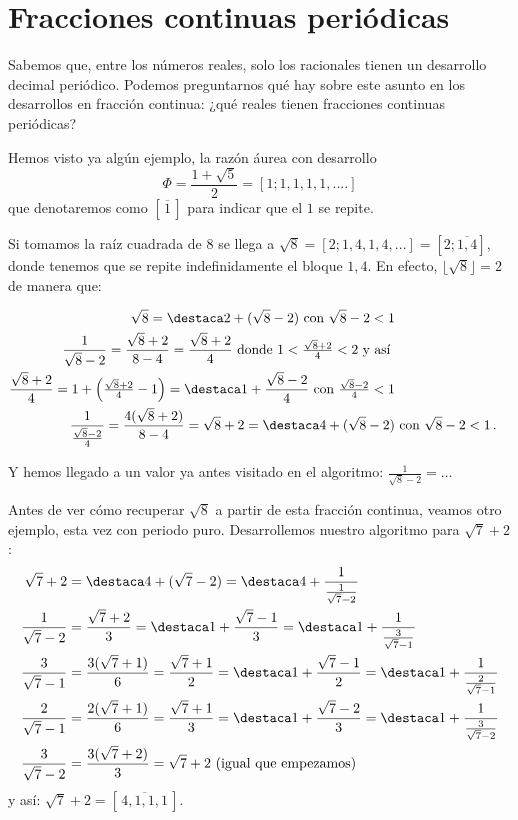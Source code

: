\section{Fracciones continuas periódicas}


Sabemos que, entre los números reales, solo los racionales tienen un desarrollo decimal periódico. Podemos preguntarnos qué hay sobre este asunto en los desarrollos en fracción continua: ¿qué reales tienen fracciones continuas periódicas?

Hemos visto ya algún ejemplo, la razón áurea con desarrollo
$$
\Phi=\frac{1+\sqrt5}2=[1;1,1,1,1,....]
$$
que denotaremos como $[\,\overline 1\,]$ para indicar que el $1$ se repite.

Si tomamos la raíz cuadrada de $8$ se llega a $\sqrt8=[2;1,4,1,4,...]=[2;\overline{1,4}]$, donde tenemos que se repite indefinidamente el bloque $1,4$. En efecto, $\lfloor\sqrt8\rfloor=2$ de manera que:

\begin{align*}
\sqrt8=\destaca2+(\sqrt8-2) \text{ con }\sqrt8-2<1\\
\frac1{\sqrt8-2}=\frac{\sqrt8+2}{8-4}=\frac{\sqrt8+2}{4}
\text{ donde } 1<\tfrac{\sqrt8+2}{4}<2 \text{ y así }\\
\frac{\sqrt8+2}{4}=1+\left(\tfrac{\sqrt8+2}{4}-1\right)=
\destaca1+\frac{\sqrt8-2}{4}
\text{ con }\tfrac{\sqrt8-2}{4}<1\\
\frac1{\frac{\sqrt8-2}4}=\frac{4(\sqrt8+2)}{8-4}=\sqrt8+2=\destaca4+(\sqrt8-2)
&\text{ con }\sqrt8-2<1\,.
\end{align*}



Y hemos llegado a un valor ya antes visitado en el algoritmo: $\frac1{\sqrt8-2}=\dots$

Antes de ver cómo recuperar $\sqrt8$ a partir de esta fracción continua, veamos otro ejemplo, esta vez con periodo puro. Desarrollemos nuestro algoritmo para $\sqrt7+2$:
\begin{align*}
\sqrt7+2&=\destaca4 +(\sqrt7-2)=\destaca4+\frac1{\frac 1{\sqrt7-2}}\\
\frac1{\sqrt7-2}&=\frac{\sqrt7+2}{3}=\destaca1+\frac{\sqrt7-1}{3}=\destaca1+
\frac1{\frac3{\sqrt7-1}}\\
\frac3{\sqrt7-1}&=\frac{3(\sqrt7+1)}{6}=\frac{\sqrt7+1}{2}=\destaca1+
\frac{\sqrt7-1}{2}=\destaca1+\frac1{\frac2{\sqrt7-1}}\\
\frac2{\sqrt7-1}&=\frac{2(\sqrt7+1)}{6}=\frac{\sqrt7+1}{3}=
\destaca1+\frac{\sqrt7-2}{3}=\destaca1+\frac1{\frac3{\sqrt7-2}}\\
\frac3{\sqrt7-2}&=\frac{3(\sqrt7+2)}{3}=\sqrt7+2\,\, \text{(igual que empezamos)}
\end{align*}
y así: $\sqrt7+2=[\,\overline{4,1,1,1}\,]$.

